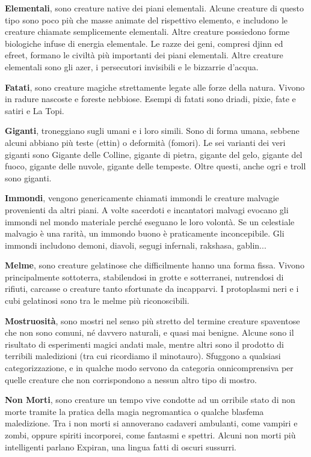 \begin{multicols}{2}
\smallskip\textbf{Elementali}, sono creature native dei piani elementali. Alcune creature di questo tipo sono poco più che masse animate del rispettivo elemento, e includono le creature chiamate semplicemente elementali. Altre creature possiedono forme biologiche infuse di energia elementale. Le razze dei geni, compresi djinn ed efreet, formano le civiltà più importanti dei piani elementali. Altre creature elementali sono gli azer, i persecutori invisibili e le bizzarrie d'acqua.

\smallskip\textbf{Fatati}, sono creature magiche strettamente legate alle forze della natura. Vivono in radure nascoste e foreste nebbiose. Esempi di fatati sono driadi, pixie, fate e satiri e La Topi.

\smallskip\textbf{Giganti}, troneggiano sugli umani e i loro simili. Sono di forma umana, sebbene alcuni abbiano più teste (ettin) o deformità (fomori). Le sei varianti dei veri giganti sono Gigante delle Colline, gigante di pietra, gigante del gelo, gigante del fuoco, gigante delle nuvole, gigante delle tempeste. Oltre questi, anche ogri e troll sono giganti.

\smallskip\textbf{Immondi}, vengono genericamente chiamati immondi le creature malvagie provenienti da altri piani. A volte sacerdoti e incantatori malvagi evocano gli immondi nel mondo materiale perché eseguano le loro volontà. Se un celestiale malvagio è una rarità, un immondo buono è praticamente inconcepibile. Gli immondi includono demoni, diavoli, segugi infernali, rakshasa, gablin...

\smallskip\textbf{Melme}, sono creature gelatinose che difficilmente hanno una forma fissa. Vivono principalmente sottoterra, stabilendosi in grotte e sotterranei, nutrendosi di rifiuti, carcasse o creature tanto sfortunate da incapparvi. I protoplasmi neri e i cubi gelatinosi sono tra le melme più riconoscibili.

\smallskip\textbf{Mostruosità}, sono mostri nel senso più stretto del termine creature spaventose che non sono comuni, né davvero naturali, e quasi mai benigne. Alcune sono il risultato di esperimenti magici andati male, mentre altri sono il prodotto di terribili maledizioni (tra cui ricordiamo il minotauro). Sfuggono a qualsiasi categorizzazione, e in qualche modo servono da categoria onnicomprensiva per quelle creature che non corrispondono a nessun altro tipo di mostro.

\smallskip\textbf{Non Morti}, sono creature un tempo vive condotte ad un orribile stato di non morte tramite la pratica della magia negromantica o qualche blasfema maledizione. Tra i non morti si annoverano cadaveri ambulanti, come vampiri e zombi, oppure spiriti incorporei, come fantasmi e spettri. Alcuni non morti più intelligenti parlano Expiran, una lingua fatti di oscuri sussurri.


\end{multicols}
